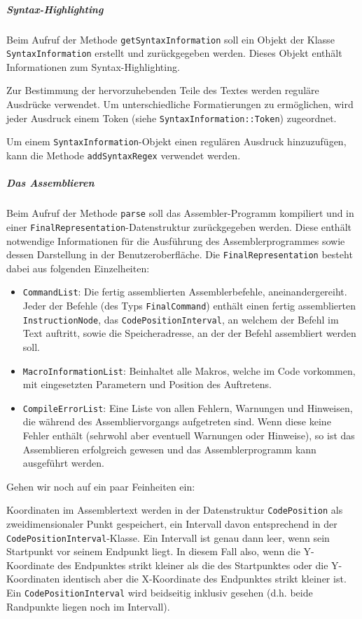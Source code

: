 \subparagraph{Syntax-Highlighting}

Beim Aufruf der Methode \texttt{getSyntaxInformation} soll ein Objekt der Klasse
\texttt{SyntaxInformation} erstellt und zurückgegeben werden. Dieses Objekt
enthält Informationen zum Syntax-Highlighting.

Zur Bestimmung der hervorzuhebenden Teile des Textes werden reguläre Ausdrücke
verwendet. Um unterschiedliche Formatierungen zu ermöglichen, wird jeder
Ausdruck einem Token (siehe \texttt{SyntaxInformation::Token}) zugeordnet.

Um einem \texttt{SyntaxInformation}-Objekt einen regulären Ausdruck hinzuzufügen,
kann die Methode \texttt{addSyntaxRegex} verwendet werden.

\subparagraph{Das Assemblieren}

Beim Aufruf der Methode \texttt{parse} soll das Assembler-Programm kompiliert
und in einer \texttt{FinalRepresentation}-Datenstruktur zurückgegeben werden.
Diese enthält notwendige Informationen für die Ausführung des
Assemblerprogrammes sowie dessen Darstellung in der Benutzeroberfläche. Die
\texttt{FinalRepresentation} besteht dabei aus folgenden Einzelheiten:

\begin{itemize}
\item \texttt{CommandList}: Die fertig assemblierten Assemblerbefehle,
aneinandergereiht. Jeder der Befehle (des Typs \texttt{FinalCommand}) enthält
einen fertig assemblierten \texttt{InstructionNode}, das
\texttt{CodePositionInterval}, an welchem der Befehl im Text auftritt, sowie die
Speicheradresse, an der der Befehl assembliert werden soll.
\item \texttt{MacroInformationList}: Beinhaltet alle Makros, welche im Code
vorkommen, mit eingesetzten Parametern und Position des Auftretens.
\item \texttt{CompileErrorList}: Eine Liste von allen Fehlern, Warnungen und
Hinweisen, die während des Assembliervorgangs aufgetreten sind. Wenn diese keine
Fehler enthält (sehrwohl aber eventuell Warnungen oder Hinweise), so ist das
Assemblieren erfolgreich gewesen und das Assemblerprogramm kann ausgeführt
werden.
\end{itemize}

Gehen wir noch auf ein paar Feinheiten ein:

Koordinaten im Assemblertext werden in der Datenstruktur \texttt{CodePosition}
als zweidimensionaler Punkt gespeichert, ein Intervall davon entsprechend in der
\texttt{CodePositionInterval}-Klasse. Ein Intervall ist genau dann leer, wenn
sein Startpunkt vor seinem Endpunkt liegt. In diesem Fall also, wenn die
Y-Koordinate des Endpunktes strikt kleiner als die des Startpunktes oder die
Y-Koordinaten identisch aber die X-Koordinate des Endpunktes strikt kleiner ist.
Ein \texttt{CodePositionInterval} wird beidseitig inklusiv gesehen (d.h. beide Randpunkte
liegen noch im Intervall).

